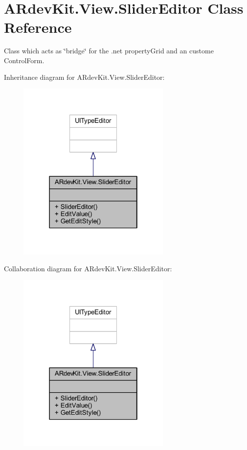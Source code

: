 \hypertarget{class_a_rdev_kit_1_1_view_1_1_slider_editor}{\section{A\-Rdev\-Kit.\-View.\-Slider\-Editor Class Reference}
\label{class_a_rdev_kit_1_1_view_1_1_slider_editor}
}


Class which acts as \char`\"{}bridge\char`\"{} for the .net property\-Grid and an custome Control\-Form.  




Inheritance diagram for A\-Rdev\-Kit.\-View.\-Slider\-Editor\-:
\nopagebreak
\begin{figure}[H]
\begin{center}
\leavevmode
\includegraphics[width=214pt]{class_a_rdev_kit_1_1_view_1_1_slider_editor__inherit__graph}
\end{center}
\end{figure}


Collaboration diagram for A\-Rdev\-Kit.\-View.\-Slider\-Editor\-:
\nopagebreak
\begin{figure}[H]
\begin{center}
\leavevmode
\includegraphics[width=214pt]{class_a_rdev_kit_1_1_view_1_1_slider_editor__coll__graph}
\end{center}
\end{figure}
